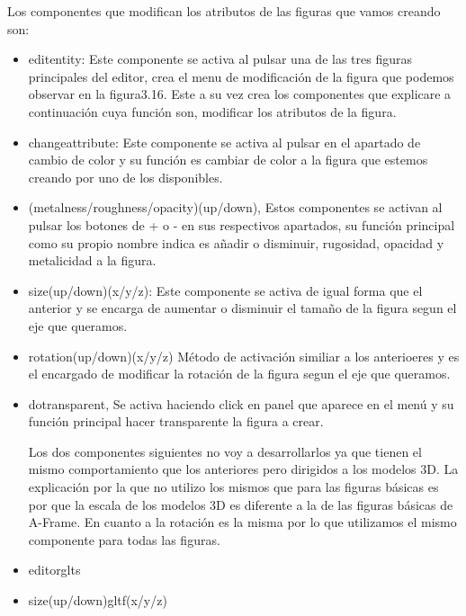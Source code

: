 \documentclass[a4paper, 12pt]{book}
\begin{document}
Los componentes que modifican los atributos de las figuras que vamos creando son:
\begin{itemize}
    \item editentity: Este componente se activa al pulsar una de las tres figuras principales del editor, crea el menu de modificación de la figura que podemos observar en la figura3.16. Este a su vez crea los componentes que explicare a continuación cuya función son, modificar los atributos de la figura.
    \item changeattribute: Este componente se activa al pulsar en el apartado de cambio de color y su función es cambiar de color a la figura que estemos creando por uno de los disponibles.
    \item (metalness/roughness/opacity)(up/down), Estos componentes se activan al pulsar los botones de + o - en sus respectivos apartados, su función principal como su propio nombre indica es añadir o disminuir, rugosidad, opacidad y metalicidad a la figura.
    \item size(up/down)(x/y/z): Este componente se activa de igual forma que el anterior y se encarga de aumentar o disminuir el tamaño de la figura segun el eje que queramos.
    \item rotation(up/down)(x/y/z) Método de activación similiar a los anterioeres y es el encargado de modificar la rotación de la figura segun el eje que queramos.
    \item dotransparent, Se activa haciendo click en panel que aparece en el menú y  su función principal hacer transparente la figura a crear.
    
    Los dos componentes siguientes no voy a desarrollarlos ya que tienen el mismo comportamiento que los anteriores pero dirigidos a los modelos 3D. La explicación por la que no utilizo los mismos que para las figuras básicas es por que la escala de los modelos 3D es diferente a la de las figuras básicas de A-Frame. En cuanto a la rotación es la misma por lo que utilizamos el mismo componente para todas las figuras. 
    \item editorglts
    \item size(up/down)gltf(x/y/z)
\end{itemize}
\end{document}
